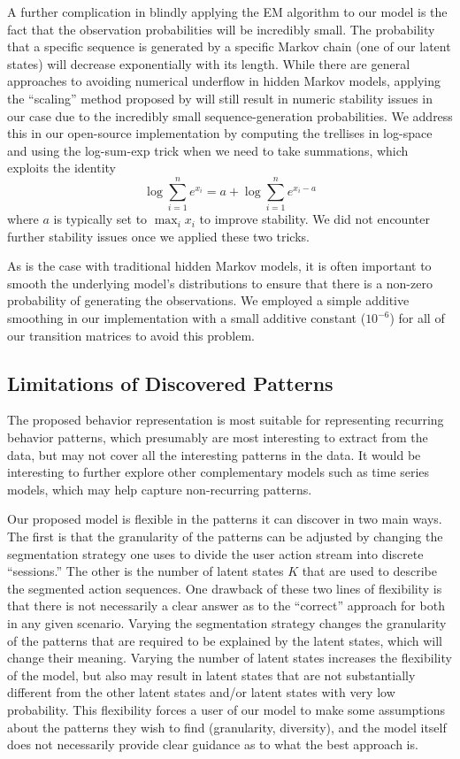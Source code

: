 A further complication in blindly applying the EM algorithm to our model is
the fact that the observation probabilities will be incredibly small. The
probability that a specific sequence is generated by a specific Markov
chain (one of our latent states) will decrease exponentially with its
length. While there are general approaches to avoiding numerical underflow
in hidden Markov models, applying the ``scaling'' method proposed by
\citet{Rabiner:1990:RSR} will still result in numeric stability issues in
our case due to the incredibly small sequence-generation probabilities. We
address this in our open-source implementation by computing the trellises
in log-space and using the log-sum-exp trick when we need to take
summations, which exploits the identity
\begin{equation}
    \log \sum_{i=1}^n e^{x_i} = a + \log \sum_{i=1}^n e^{x_i - a}
\end{equation}
where $a$ is typically set to $\max_i x_i$ to improve stability. We did not
encounter further stability issues once we applied these two tricks.

As is the case with traditional hidden Markov models, it is often important
to smooth the underlying model's distributions to ensure that there is a
non-zero probability of generating the observations. We employed a simple
additive smoothing in our implementation with a small additive constant
($10^{-6}$) for all of our transition matrices to avoid this problem.

\subsection{Limitations of Discovered Patterns}

The proposed behavior representation is most suitable for representing
recurring behavior patterns, which presumably are most interesting to
extract from the data, but may not cover all the interesting patterns in
the data. It would be interesting to further explore other complementary
models such as time series models, which may help capture non-recurring
patterns.

Our proposed model is flexible in the patterns it can discover in two main
ways. The first is that the granularity of the patterns can be adjusted by
changing the segmentation strategy one uses to divide the user action
stream into discrete ``sessions.'' The other is the number of latent
states $K$ that are used to describe the segmented action sequences. One
drawback of these two lines of flexibility is that there is not necessarily
a clear answer as to the ``correct'' approach for both in any given
scenario. Varying the segmentation strategy changes the granularity of the
patterns that are required to be explained by the latent states, which will
change their meaning. Varying the number of latent states increases the
flexibility of the model, but also may result in latent states that are not
substantially different from the other latent states and/or latent states
with very low probability. This flexibility forces a user of our model to
make some assumptions about the patterns they wish to find (granularity,
diversity), and the model itself does not necessarily provide clear
guidance as to what the best approach is.

